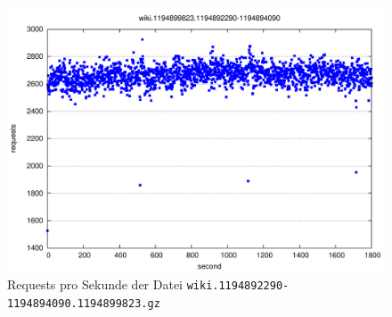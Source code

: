 \begin{figure}
  \centering
  \includegraphics[width=\textwidth]{images/trace-filtered}
  \caption{Requests pro Sekunde der Datei \texttt{wiki.1194892290-1194894090.1194899823.gz}}
  \label{fig:trace-filtered}
\end{figure}


